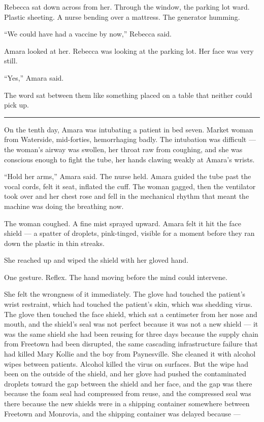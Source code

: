 \documentclass[11pt]{article}
\begin{document}
Rebecca sat down across from her. Through the window, the parking lot ward. Plastic sheeting. A nurse bending over a mattress. The generator humming.

``We could have had a vaccine by now,'' Rebecca said.

Amara looked at her. Rebecca was looking at the parking lot. Her face was very still.

``Yes,'' Amara said.

The word sat between them like something placed on a table that neither could pick up.

\begin{center}\rule{0.3\linewidth}{0.4pt}\end{center}

On the tenth day, Amara was intubating a patient in bed seven. Market woman from Waterside, mid-forties, hemorrhaging badly. The intubation was difficult --- the woman's airway was swollen, her throat raw from coughing, and she was conscious enough to fight the tube, her hands clawing weakly at Amara's wrists.

``Hold her arms,'' Amara said. The nurse held. Amara guided the tube past the vocal cords, felt it seat, inflated the cuff. The woman gagged, then the ventilator took over and her chest rose and fell in the mechanical rhythm that meant the machine was doing the breathing now.

The woman coughed. A fine mist sprayed upward. Amara felt it hit the face shield --- a spatter of droplets, pink-tinged, visible for a moment before they ran down the plastic in thin streaks.

She reached up and wiped the shield with her gloved hand.

One gesture. Reflex. The hand moving before the mind could intervene.

She felt the wrongness of it immediately. The glove had touched the patient's wrist restraint, which had touched the patient's skin, which was shedding virus. The glove then touched the face shield, which sat a centimeter from her nose and mouth, and the shield's seal was not perfect because it was not a new shield --- it was the same shield she had been reusing for three days because the supply chain from Freetown had been disrupted, the same cascading infrastructure failure that had killed Mary Kollie and the boy from Paynesville. She cleaned it with alcohol wipes between patients. Alcohol killed the virus on surfaces. But the wipe had been on the outside of the shield, and her glove had pushed the contaminated droplets toward the gap between the shield and her face, and the gap was there because the foam seal had compressed from reuse, and the compressed seal was there because the new shields were in a shipping container somewhere between Freetown and Monrovia, and the shipping container was delayed because ---
\end{document}
